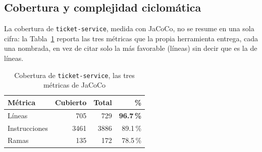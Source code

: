 \subsection{Cobertura y complejidad ciclomática}

La cobertura de \texttt{ticket-service}, medida con JaCoCo, no se resume en una sola cifra:
la Tabla~\ref{tab:cobertura-completa} reporta las tres métricas que la propia herramienta
entrega, cada una nombrada, en vez de citar solo la más favorable (líneas) sin decir que es la
de líneas.

\begin{table}[H]
\centering
\caption{Cobertura de \texttt{ticket-service}, las tres métricas de JaCoCo}
\label{tab:cobertura-completa}
\begin{tabular}{@{}lrrr@{}}
\toprule
\textbf{Métrica} & \textbf{Cubierto} & \textbf{Total} & \textbf{\%} \\
\midrule
Líneas & 705 & 729 & \textbf{96.7\,\%} \\
Instrucciones & 3461 & 3886 & 89.1\,\% \\
Ramas & 135 & 172 & 78.5\,\% \\
\bottomrule
\end{tabular}
\end{table}

